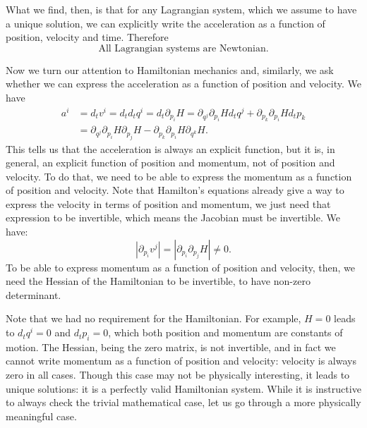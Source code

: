 What we find, then, is that for any Lagrangian system, which we assume to have a unique solution, we can explicitly write the acceleration as a function of position, velocity and time. Therefore
\begin{equation}
	\textrm{All Lagrangian systems are Newtonian.}
\end{equation}

Now we turn our attention to Hamiltonian mechanics and, similarly, we ask whether we can express the acceleration as a function of position and velocity. We have
\begin{equation}
	\begin{aligned}
		a^i &= d_t v^i = d_t d_t q^i = d_t \partial_{p_i} H = \partial_{q^j} \partial_{p_i} H d_t q^j + \partial_{p_k} \partial_{p_i} H d_t p_k \\
		&= \partial_{q^j} \partial_{p_i} H \partial_{p_j} H - \partial_{p_k} \partial_{p_i} H \partial_{q^k} H.
	\end{aligned}
\end{equation}
This tells us that the acceleration is always an explicit function, but it is, in general, an explicit function of position and momentum, not of position and velocity. To do that, we need to be able to express the momentum as a function of position and velocity. Note that Hamilton's equations already give a way to express the velocity in terms of position and momentum, we just need that expression to be invertible, which means the Jacobian must be invertible. We have:
\begin{equation}
	\left|\partial_{p_i} v^j\right| = \left|\partial_{p_i}\partial_{p_j} H\right| \neq 0 .
\end{equation}
To be able to express momentum as a function of position and velocity, then, we need the Hessian of the Hamiltonian to be invertible, to have non-zero determinant.

Note that we had no requirement for the Hamiltonian. For example, $H=0$ leads to $d_t q^i = 0$ and $d_t p_i = 0$, which both position and momentum are constants of motion. The Hessian, being the zero matrix, is not invertible, and in fact we cannot write momentum as a function of position and velocity: velocity is always zero in all cases. Though this case may not be physically interesting, it leads to unique solutions: it is a perfectly valid Hamiltonian system. While it is instructive to always check the trivial mathematical case, let us go through a more physically meaningful case.

